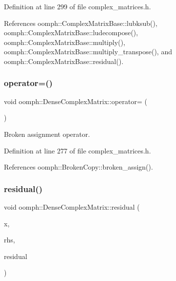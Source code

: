 Definition at line 299 of file complex\+\_\+matrices.\+h.



References oomph\+::\+Complex\+Matrix\+Base\+::lubksub(), oomph\+::\+Complex\+Matrix\+Base\+::ludecompose(), oomph\+::\+Complex\+Matrix\+Base\+::multiply(), oomph\+::\+Complex\+Matrix\+Base\+::multiply\+\_\+transpose(), and oomph\+::\+Complex\+Matrix\+Base\+::residual().

\mbox{\label{classoomph_1_1DenseComplexMatrix_a6a4e396c02a3d0407ce7facbffac954b}} 
\subsubsection{\texorpdfstring{operator=()}{operator=()}}
{\footnotesize\ttfamily void oomph\+::\+Dense\+Complex\+Matrix\+::operator= (\begin{DoxyParamCaption}\item[{const \hyperlink{classoomph_1_1DenseComplexMatrix}{Dense\+Complex\+Matrix} \&}]{ }\end{DoxyParamCaption})\hspace{0.3cm}{\ttfamily [inline]}}



Broken assignment operator. 



Definition at line 277 of file complex\+\_\+matrices.\+h.



References oomph\+::\+Broken\+Copy\+::broken\+\_\+assign().

\mbox{\label{classoomph_1_1DenseComplexMatrix_a76146afe81a055af475a107231468afb}} 
\subsubsection{\texorpdfstring{residual()}{residual()}}
{\footnotesize\ttfamily void oomph\+::\+Dense\+Complex\+Matrix\+::residual (\begin{DoxyParamCaption}\item[{const \hyperlink{classoomph_1_1Vector}{Vector}$<$ std\+::complex$<$ double $>$ $>$ \&}]{x,  }\item[{const \hyperlink{classoomph_1_1Vector}{Vector}$<$ std\+::complex$<$ double $>$ $>$ \&}]{rhs,  }\item[{\hyperlink{classoomph_1_1Vector}{Vector}$<$ std\+::complex$<$ double $>$ $>$ \&}]{residual }\end{DoxyParamCaption})\hspace{0.3cm}{\ttfamily [virtual]}}



